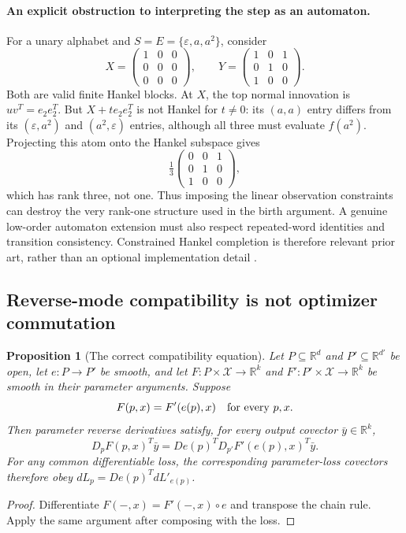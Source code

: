 \documentclass[11pt]{article}
\newtheorem{proposition}[theorem]{Proposition}
\theoremstyle{definition}
\theoremstyle{remark}
\begin{document}
\paragraph{An explicit obstruction to interpreting the step as an automaton.}
For a unary alphabet and $S=E=\{\varepsilon,a,a^2\}$, consider
\[
 X=\begin{pmatrix}1&0&0\\0&0&0\\0&0&0\end{pmatrix},\qquad
 Y=\begin{pmatrix}1&0&1\\0&1&0\\1&0&0\end{pmatrix}.
\]
Both are valid finite Hankel blocks. At $X$, the top normal innovation is
$uv^T=e_2e_2^T$. But $X+te_2e_2^T$ is not Hankel for $t\ne0$:
its $(a,a)$ entry differs from its $(\varepsilon,a^2)$ and
$(a^2,\varepsilon)$ entries, although all three must evaluate $f(a^2)$.
Projecting this atom onto the Hankel subspace gives
\[
 \tfrac13\begin{pmatrix}0&0&1\\0&1&0\\1&0&0\end{pmatrix},
\]
which has rank three, not one. Thus imposing the linear observation
constraints can destroy the very rank-one structure used in the birth
argument. A genuine low-order automaton extension must also respect
repeated-word identities and transition consistency. Constrained Hankel
completion is therefore relevant prior art, rather than an optional
implementation detail \cite{ce:balle2012}.

\subsection{Reverse-mode compatibility is not optimizer commutation}

\begin{proposition}[The correct compatibility equation]
\label{ce:pullback}
Let $P\subseteq\mathbb R^d$ and $P'\subseteq\mathbb R^{d'}$ be open,
let $e:P\to P'$ be smooth, and let $F:P\times\mathcal X\to\mathbb R^k$
and $F':P'\times\mathcal X\to\mathbb R^k$ be smooth in their parameter
arguments. Suppose
\[
 F(p,x)=F'(e(p),x)\quad\hbox{for every }p,x.
\]
Then parameter reverse derivatives satisfy, for every output covector
$\bar y\in\mathbb R^k$,
\[
 D_pF(p,x)^T\bar y
 =De(p)^T D_{p'}F'(e(p),x)^T\bar y.
\]
For any common differentiable loss, the corresponding parameter-loss
covectors therefore obey $dL_p=De(p)^T dL'_{e(p)}$.
\end{proposition}
\begin{proof}
Differentiate $F(-,x)=F'(-,x)\circ e$ and transpose the chain rule.
Apply the same argument after composing with the loss.
\end{proof}
\end{document}
